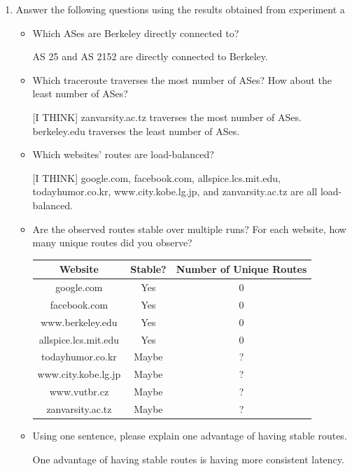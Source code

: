 \documentclass[10pt]{article}
\begin{document}
\begin{enumerate}

\item Answer the following questions using the results obtained from experiment a

\begin{itemize}

\item Which ASes are Berkeley directly connected to?

AS 25 and AS 2152 are directly connected to Berkeley.

\item Which traceroute traverses the most number of ASes? How about the least number of ASes?

[I THINK] zanvarsity.ac.tz traverses the most number of ASes. berkeley.edu traverses the least number of ASes.

\item Which websites' routes are load-balanced?

[I THINK] google.com, facebook.com, allspice.lcs.mit.edu, todayhumor.co.kr, www.city.kobe.lg.jp, and zanvarsity.ac.tz are all load-balanced.

\item Are the observed routes stable over multiple runs? For each website, how many unique routes did you observe?

\begin{center}
\begin{tabular}{ || c | c | c || }
\hline
Website & Stable? & Number of Unique Routes \\
\hline \hline
google.com & Yes & 0 \\
\hline
facebook.com & Yes & 0 \\
\hline
www.berkeley.edu & Yes & 0 \\
\hline
allspice.lcs.mit.edu & Yes & 0 \\
\hline
todayhumor.co.kr & Maybe & ? \\
\hline
www.city.kobe.lg.jp & Maybe & ? \\
\hline
www.vutbr.cz & Maybe & ? \\
\hline
zanvarsity.ac.tz & Maybe & ? \\
\hline
\end{tabular}
\end{center}

\item Using one sentence, please explain one advantage of having stable routes.

One advantage of having stable routes is having more consistent latency.


\end{itemize}
\end{enumerate}
\end{document}
